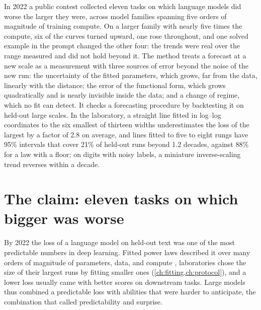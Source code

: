 \begin{refsection}

\begin{chaptersummary}
In 2022 a public contest collected eleven tasks on which language models did worse the larger they were, across model families spanning five orders of magnitude of training compute. On a larger family with nearly five times the compute, six of the curves turned upward, one rose throughout, and one solved example in the prompt changed the other four: the trends were real over the range measured and did not hold beyond it. The method treats a forecast at a new scale as a measurement with three sources of error beyond the noise of the new run: the uncertainty of the fitted parameters, which grows, far from the data, linearly with the distance; the error of the functional form, which grows quadratically and is nearly invisible inside the data; and a change of regime, which no fit can detect. It checks a forecasting procedure by backtesting it on held-out large scales. In the laboratory, a straight line fitted in log--log coordinates to the six smallest of thirteen widths underestimates the loss of the largest by a factor of 2.8 on average, and lines fitted to five to eight rungs have 95\% intervals that cover 21\% of held-out runs beyond 1.2 decades, against 88\% for a law with a floor; on digits with noisy labels, a miniature inverse-scaling trend reverses within a decade.
\end{chaptersummary}

\section{The claim: eleven tasks on which bigger was worse}\label{sec:extrapolation:claim}

By 2022 the loss of a language model on held-out text was one of the most predictable numbers in deep learning. Fitted power laws described it over many orders of magnitude of parameters, data, and compute \parencite{KaplanEtAl2020,HoffmannEtAl2022}, laboratories chose the size of their largest runs by fitting smaller ones (\cref{ch:fitting,ch:protocol}), and a lower loss usually came with better scores on downstream tasks. Large models thus combined a predictable loss with abilities that were harder to anticipate, the combination that \textcite{GanguliEtAl2022} called predictability and surprise.


\end{refsection}
